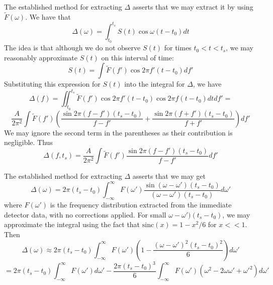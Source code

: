 \documentclass{./src/gm2}
\begin{document}
The established method for extracting $\Delta$ asserts that we may extract it by using $\tilde{F}(\omega)$. We have that  \[\Delta(\omega)=\int^{t_s}_{t_0}S(t)\cos\omega(t-t_0)dt\] The idea is that although we do not observe $S(t)$ for times $t_0<t<t_s$, we may reasonably approximate $S(t)$ on this interval of time:\[S(t)=\int \tilde{F}(f')\cos2\pi f'(t-t_0)df'\] Substituting this expression for $S(t)$ into the integral for $\Delta$, we have \[\Delta(f)=\iint^{t_s}_{t_0}\tilde{F}(f')\cos2\pi f'(t-t_0)\cos2\pi f(t-t_0)dtdf'=\]\[\frac{A}{2\pi^2}\int \tilde{F}(f')\left(\frac{\sin2\pi(f-f')(t_s-t_0)}{f-f'}+\frac{\sin2\pi(f+f')(t_s-t_0)}{f+f'}\right)df'\] We may ignore the second term in the parentheses as their contribution is negligible. Thus \[\Delta(f,t_s)=\frac{A}{2\pi^2}\int \tilde{F}(f')\frac{\sin2\pi(f-f')(t_s-t_0)}{f-f'}df'\]


The established method for extracting $\Delta$ asserts that we may get \[\Delta(\omega)=2\pi(t_s-t_0)\int^{\infty}_{-\infty}F(\omega')\frac{\sin(\omega-\omega')(t_s-t_0)}{(\omega-\omega')(t_s-t_0)}d\omega'\] where $F(\omega')$ is the frequency distribution extracted from the immediate detector data, with no corrections applied. For small $\omega-\omega')(t_s-t_0)$, we may approximate the integral using the fact that $\text{sinc}(x)=1-x^2/6$ for $x<<1$. Then \[\Delta(\omega)\approx2\pi(t_s-t_0)\int^{\infty}_{-\infty}F(\omega')\left(1-\frac{(\omega-\omega')^2(t_s-t_0)^2}{6}\right)d\omega'\]\[=2\pi(t_s-t_0)\int^{\infty}_{-\infty}F(\omega')d\omega'-\frac{2\pi(t_s-t_0)^3}{6}\int^{\infty}_{-\infty}F(\omega')(\omega^2-2\omega\omega'+\omega'^2)d\omega'\]
\end{document}
